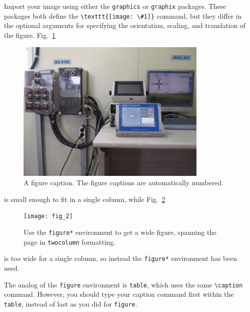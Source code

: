 \documentclass[%
 aip,
 amsmath,amssymb,
preprint,%
]{revtex4-1}
\begin{document}
Import your image using either the \texttt{graphics} or
\texttt{graphix} packages. These packages both define the
\verb+\texttt{[image: \#1]}+ command, but they differ in the optional
arguments for specifying the orientation, scaling, and translation of the figure.
Fig.~\ref{fig:epsart}%
\begin{figure}
\includegraphics{fig_1}%
\caption{\label{fig:epsart} A figure caption. The figure captions are
automatically numbered.}
\end{figure}
is small enough to fit in a single column, while
Fig.~\ref{fig:wide}%
\begin{figure}
\texttt{[image: fig\_2]}%
\caption{\label{fig:wide}Use the \texttt{figure*} environment to get a wide
figure, spanning the page in \texttt{twocolumn} formatting.}
\end{figure}
is too wide for a single column,
so instead the \texttt{figure*} environment has been used.

The analog of the \texttt{figure} environment is \texttt{table}, which uses
the same \verb+\caption+ command.
However, you should type your caption command first within the \texttt{table}, 
instead of last as you did for \texttt{figure}.
\end{document}
